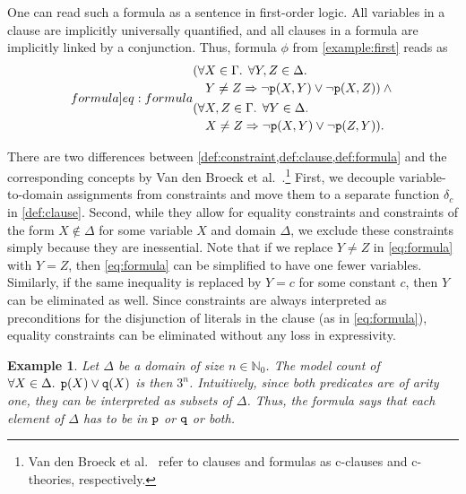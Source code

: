 \documentclass{article}
\newtheorem{example}{Example}
\newcommand{\predicate}{\texttt{\textup{p}}}
\newcommand{\predicateq}{\texttt{\textup{q}}}
\begin{document}
One can read such a formula as a sentence in first-order logic. All variables in
a clause are implicitly universally quantified, and all clauses in a formula are
implicitly linked by a conjunction. Thus, formula $\phi$ from
\cref{example:first} reads as
\begin{equation}\label[formula]{eq:formula}
  \begin{split}
    &\begin{multlined}[t]
      (\forall X \in \Gamma\text{. }\forall Y, Z \in \Delta\text{. }\\
      Y \ne Z \Rightarrow \neg \predicate(X, Y) \lor \neg \predicate(X, Z)) \land{}
    \end{multlined}\\
    &\begin{multlined}[t]
      (\forall X, Z \in \Gamma\text{. }\forall Y \in \Delta\text{. }\\
      X \ne Z \Rightarrow \neg \predicate(X, Y) \lor \neg \predicate(Z, Y)).
    \end{multlined}
  \end{split}
\end{equation}

There are two differences between \cref{def:constraint,def:clause,def:formula}
and the corresponding concepts by Van den Broeck et
al.~.\footnote{Van den Broeck et
  al.~ refer to clauses and formulas as
  c-clauses and c-theories, respectively.} First, we decouple variable-to-domain
assignments from constraints and move them to a separate function $\delta_{c}$
in \cref{def:clause}. Second, while they allow for equality constraints and
constraints of the form $X \not\in \Delta$ for some variable $X$ and domain
$\Delta$, we exclude these constraints simply because they are inessential. Note
that if we replace $Y \ne Z$ in \cref{eq:formula} with $Y = Z$, then
\cref{eq:formula} can be simplified to have one fewer variables. Similarly, if
the same inequality is replaced by $Y = c$ for some constant $c$, then $Y$ can
be eliminated as well. Since constraints are always interpreted as preconditions
for the disjunction of literals in the clause (as in \cref{eq:formula}),
equality constraints can be eliminated without any loss in expressivity.

\begin{example}\label{example:simple}
  Let $\Delta$ be a domain of size $n \in \mathbb{N}_{0}$. The model count of
  $\forall X \in \Delta\text{. } \predicate(X) \lor \predicateq(X)$ is then
  $3^{n}$. Intuitively, since both predicates are of arity one, they can be
  interpreted as subsets of $\Delta$. Thus, the formula says that each element
  of $\Delta$ has to be in $\predicate$ or $\predicateq$ or both.
\end{example}
\end{document}
